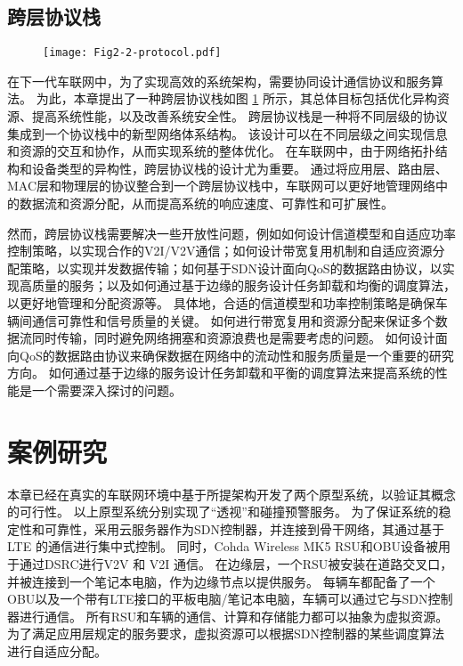 \subsection{跨层协议栈}

\begin{figure}[h] 
	\centering
	\texttt{[image: Fig2-2-protocol.pdf]}
	\label{fig 2-2}
\end{figure}


在下一代车联网中，为了实现高效的系统架构，需要协同设计通信协议和服务算法。
为此，本章提出了一种跨层协议栈如图 \ref{fig 2-2} 所示，其总体目标包括优化异构资源、提高系统性能，以及改善系统安全性。
跨层协议栈是一种将不同层级的协议集成到一个协议栈中的新型网络体系结构。
该设计可以在不同层级之间实现信息和资源的交互和协作，从而实现系统的整体优化。
在车联网中，由于网络拓扑结构和设备类型的异构性，跨层协议栈的设计尤为重要。
通过将应用层、路由层、MAC层和物理层的协议整合到一个跨层协议栈中，车联网可以更好地管理网络中的数据流和资源分配，从而提高系统的响应速度、可靠性和可扩展性。

然而，跨层协议栈需要解决一些开放性问题，例如如何设计信道模型和自适应功率控制策略，以实现合作的V2I/V2V通信；如何设计带宽复用机制和自适应资源分配策略，以实现并发数据传输；如何基于SDN设计面向QoS的数据路由协议，以实现高质量的服务；以及如何通过基于边缘的服务设计任务卸载和均衡的调度算法，以更好地管理和分配资源等。
具体地，合适的信道模型和功率控制策略是确保车辆间通信可靠性和信号质量的关键。
如何进行带宽复用和资源分配来保证多个数据流同时传输，同时避免网络拥塞和资源浪费也是需要考虑的问题。
如何设计面向QoS的数据路由协议来确保数据在网络中的流动性和服务质量是一个重要的研究方向。
如何通过基于边缘的服务设计任务卸载和平衡的调度算法来提高系统的性能是一个需要深入探讨的问题。

\section{案例研究}\label{section 2-4}

本章已经在真实的车联网环境中基于所提架构开发了两个原型系统，以验证其概念的可行性。
以上原型系统分别实现了“透视”和碰撞预警服务。
为了保证系统的稳定性和可靠性，采用云服务器作为SDN控制器，并连接到骨干网络，其通过基于 LTE 的通信进行集中式控制。
同时，Cohda Wireless MK5 RSU和OBU设备被用于通过DSRC进行V2V 和 V2I 通信。
在边缘层，一个RSU被安装在道路交叉口，并被连接到一个笔记本电脑，作为边缘节点以提供服务。
每辆车都配备了一个OBU以及一个带有LTE接口的平板电脑/笔记本电脑，车辆可以通过它与SDN控制器进行通信。
所有RSU和车辆的通信、计算和存储能力都可以抽象为虚拟资源。
为了满足应用层规定的服务要求，虚拟资源可以根据SDN控制器的某些调度算法进行自适应分配。

